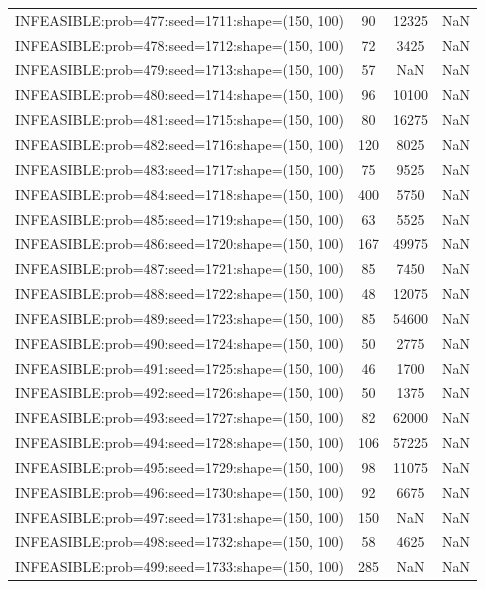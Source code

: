 \begin{longtable}{lccc}
INFEASIBLE:prob=477:seed=1711:shape=(150, 100) &    90 & 12325 &    NaN \\
INFEASIBLE:prob=478:seed=1712:shape=(150, 100) &    72 &  3425 &    NaN \\
INFEASIBLE:prob=479:seed=1713:shape=(150, 100) &    57 &   NaN &    NaN \\
INFEASIBLE:prob=480:seed=1714:shape=(150, 100) &    96 & 10100 &    NaN \\
INFEASIBLE:prob=481:seed=1715:shape=(150, 100) &    80 & 16275 &    NaN \\
INFEASIBLE:prob=482:seed=1716:shape=(150, 100) &   120 &  8025 &    NaN \\
INFEASIBLE:prob=483:seed=1717:shape=(150, 100) &    75 &  9525 &    NaN \\
INFEASIBLE:prob=484:seed=1718:shape=(150, 100) &   400 &  5750 &    NaN \\
INFEASIBLE:prob=485:seed=1719:shape=(150, 100) &    63 &  5525 &    NaN \\
INFEASIBLE:prob=486:seed=1720:shape=(150, 100) &   167 & 49975 &    NaN \\
INFEASIBLE:prob=487:seed=1721:shape=(150, 100) &    85 &  7450 &    NaN \\
INFEASIBLE:prob=488:seed=1722:shape=(150, 100) &    48 & 12075 &    NaN \\
INFEASIBLE:prob=489:seed=1723:shape=(150, 100) &    85 & 54600 &    NaN \\
INFEASIBLE:prob=490:seed=1724:shape=(150, 100) &    50 &  2775 &    NaN \\
INFEASIBLE:prob=491:seed=1725:shape=(150, 100) &    46 &  1700 &    NaN \\
INFEASIBLE:prob=492:seed=1726:shape=(150, 100) &    50 &  1375 &    NaN \\
INFEASIBLE:prob=493:seed=1727:shape=(150, 100) &    82 & 62000 &    NaN \\
INFEASIBLE:prob=494:seed=1728:shape=(150, 100) &   106 & 57225 &    NaN \\
INFEASIBLE:prob=495:seed=1729:shape=(150, 100) &    98 & 11075 &    NaN \\
INFEASIBLE:prob=496:seed=1730:shape=(150, 100) &    92 &  6675 &    NaN \\
INFEASIBLE:prob=497:seed=1731:shape=(150, 100) &   150 &   NaN &    NaN \\
INFEASIBLE:prob=498:seed=1732:shape=(150, 100) &    58 &  4625 &    NaN \\
INFEASIBLE:prob=499:seed=1733:shape=(150, 100) &   285 &   NaN &    NaN \\

\end{longtable}

